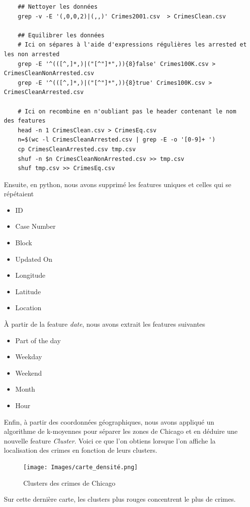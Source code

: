 \documentclass{article}
\begin{document}
    \begin{Verbatim}
    ## Nettoyer les données
    grep -v -E '(,0,0,2)|(,,)' Crimes2001.csv  > CrimesClean.csv
    
    ## Equilibrer les données
    # Ici on sépares à l'aide d'expressions régulières les arrested et les non arrested
    grep -E '^(([^,]*,)|("[^"]*",)){8}false' Crimes100K.csv > CrimesCleanNonArrested.csv
    grep -E '^(([^,]*,)|("[^"]*",)){8}true' Crimes100K.csv > CrimesCleanArrested.csv
    
    # Ici on recombine en n'oubliant pas le header contenant le nom des features
    head -n 1 CrimesClean.csv > CrimesEq.csv
    n=$(wc -l CrimesCleanArrested.csv | grep -E -o '[0-9]+ ')
    cp CrimesCleanArrested.csv tmp.csv
    shuf -n $n CrimesCleanNonArrested.csv >> tmp.csv
    shuf tmp.csv >> CrimesEq.csv
    \end{Verbatim}

    Ensuite, en python, nous avons supprimé les features uniques et
    celles qui se répétaient
    \begin{itemize}
	    \item ID
	    \item Case Number
	    \item Block
	    \item Updated On
	    \item Longitude
	    \item Latitude
	    \item Location
    \end{itemize}
    À partir de la feature \textit{date}, nous avons extrait les features suivantes
    \begin{itemize}
	    \item Part of the day
	    \item Weekday
	    \item Weekend
	    \item Month
	    \item Hour
    \end{itemize}
    Enfin, à partir des coordonnées géographiques, nous avons appliqué un algorithme
    de k-moyennes pour séparer les zones de Chicago et en déduire une nouvelle
    feature \textit{Cluster}. 
    Voici ce que l'on obtiens lorsque l'on affiche la localisation des crimes en
    fonction de leurs clusters.
    \begin{figure}[H]
    \centering
	    \texttt{[image: Images/carte\_densité.png]}
	    \caption{Clusters des crimes de Chicago}
    \end{figure}
    Sur cette dernière carte, les clusters plus rouges concentrent le plus de crimes.
\end{document}
